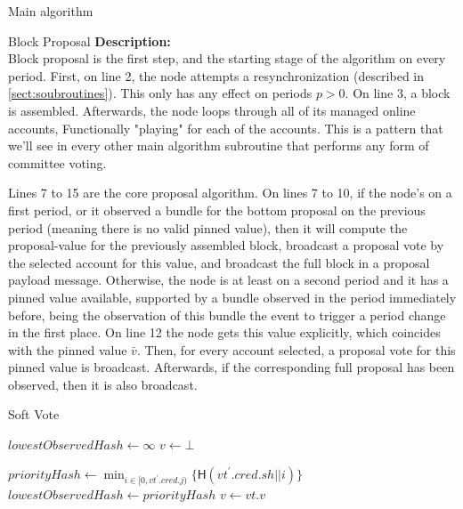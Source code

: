 \documentclass[10pt,a4paper]{article}
\begin{document}
\begin{section}{Main algorithm}
\begin{subsection}{Block Proposal}
\newpage
\noindent \textbf{Description:}\\
Block proposal is the first step, and the starting stage of the algorithm on every period.
First, on line 2, the node attempts a resynchronization (described in \ref{sect:soubroutines}). 
This only has any effect on periods $p > 0$. On line 3, a block is assembled.
Afterwards, the node loops through all of its managed online accounts, Functionally
"playing" for each of the accounts. This is a pattern that we'll see in every other
main algorithm subroutine that performs any form of committee voting.

Lines 7 to 15 are the core proposal algorithm. On lines 7 to 10, 
if the node's on a first period, or it observed a bundle for the bottom proposal on the previous 
period (meaning there is no valid pinned value), then it will compute the proposal-value for the 
previously assembled block, broadcast a proposal vote by the selected account for this value, and 
broadcast the full block in a proposal payload message.
Otherwise, the node is at least on a second period and it has a pinned value available, supported by a 
bundle observed in the period immediately before, being the observation of this bundle the event to trigger 
a period change in the first place. On line 12 the node gets this value explicitly, which coincides with the pinned
value $\bar{v}$. 
Then, for every account selected, a proposal vote for this pinned value is broadcast. Afterwards, 
if the corresponding full proposal has been observed, then it is also broadcast.


\end{subsection}
\begin{subsection}{Soft Vote}\label{ssect:softvote}

\begin{algorithm}[H]
    \begin{algorithmic}[1]
    \State $lowestObservedHash \gets \infty$
    \State $v \gets \bot$ 

        \State $priorityHash \gets \min_{i \in [0, vt^\prime.cred.j)} \{ \mathsf{H}(vt^\prime.cred.sh || i)\}$
            \State $lowestObservedHash \gets priorityHash$
            \State $v \gets vt.v$
        \EndIf    
    \EndFor


\end{algorithmic}
\end{algorithm}
\end{subsection}
\end{section}
\end{document}
